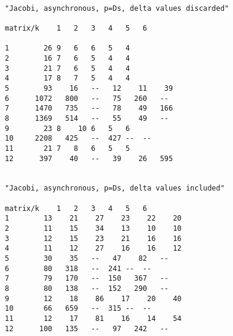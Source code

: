 \documentclass[12pt]{article}
\begin{document}
\begin{verbatim}
													
"Jacobi, asynchronous, p=Ds, delta values discarded"										
													
matrix/k	1	2	3	4	5	6	

1	     26	9	6	6	5	4							
2	     16	7	6	5	4	4							
3	     21	7	6	5	4	4							
4	     17	8	7	5	4	4							
5	     93    16	--   12    11    39							
6	   1072   800	--   75   260	--							
7	   1470   735	--   78    49   166							
8	   1369   514	--   55    49	--							
9	     23	8    10	6	5	6							
10	   2208   425	--  427	--	--							
11	     21	7	8	6	5	5							
12	    397    40	--   39    26   595							
													
													
"Jacobi, asynchronous, p=Ds, delta values included"												
													
matrix/k	1	2	3	4	5	6		
1	     13    21    27    23    22    20							
2	     11    15    34    13    10    10							
3	     12    15    23    21    16    16							
4	     11    12    27    16    16    12							
5	     30    35	--   47    82	--							
6	     80   318	--  241	--	--							
7	     79   170	--  150   367	--							
8	     80   138	--  152   290	--							
9	     12    18    86    17    20    40							
10	     66   659	--  315	--	--							
11	     12    17    81    16    14    54							
12	    100   135	--   97   242	--							
\end{verbatim}
\end{document}
